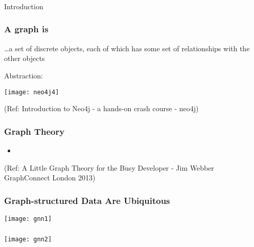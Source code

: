 \begin{frame}[fragile]\frametitle{}
\begin{center}
{\Large Introduction}
\end{center}
\end{frame}


\begin{frame}\frametitle{A graph is}
{\emph \ldots a set of discrete objects, each of which has some set of relationships with the other objects}

Abstraction:

\begin{center}
\texttt{[image: neo4j4]}
\end{center}	  

{\tiny (Ref: Introduction to Neo4j - a hands-on crash course - neo4j)}
\end{frame}


\begin{frame}\frametitle{Graph Theory}

\begin{itemize}
\item 
\end{itemize}



{\tiny (Ref: A Little Graph Theory for the Busy Developer - Jim Webber GraphConnect London 2013)}
\end{frame}

\begin{frame}[fragile]\frametitle{ Graph-structured Data Are Ubiquitous }

\begin{center}
\texttt{[image: gnn1]}
\end{center}	  

\end{frame}

\begin{frame}[fragile]\frametitle{}

\begin{center}
\texttt{[image: gnn2]}
\end{center}	  

\end{frame}

